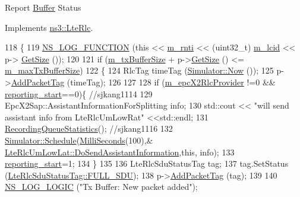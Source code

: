 Report \hyperlink{classns3_1_1Buffer}{Buffer} Status 

Implements \hyperlink{classns3_1_1LteRlc_af1e6ccdc5f9f2bee9d42a056e94351a5}{ns3\+::\+Lte\+Rlc}.


\begin{DoxyCode}
118 \{
119   \hyperlink{log-macros-disabled_8h_a90b90d5bad1f39cb1b64923ea94c0761}{NS\_LOG\_FUNCTION} (\textcolor{keyword}{this} << \hyperlink{classns3_1_1LteRlc_a48ab0a78e7f2687337075b1c8832df70}{m\_rnti} << (uint32\_t) \hyperlink{classns3_1_1LteRlc_a051085e9b27883e7ba4b98ad7242fd8a}{m\_lcid} << p->
      \hyperlink{classns3_1_1Packet_a462855c9929954d4301a4edfe55f4f1c}{GetSize} ());
120 
121   \textcolor{keywordflow}{if} (\hyperlink{classns3_1_1LteRlcUmLowLat_a730b3933118b7d511e4aedab828e07aa}{m\_txBufferSize} + p->\hyperlink{classns3_1_1Packet_a462855c9929954d4301a4edfe55f4f1c}{GetSize} () <= \hyperlink{classns3_1_1LteRlcUmLowLat_ae50ae79e638fbeadc0a89e7a4f4371e1}{m\_maxTxBufferSize})
122     \{
124       RlcTag timeTag (\hyperlink{classns3_1_1Simulator_ac3178fa975b419f7875e7105be122800}{Simulator::Now} ());
125       p->\hyperlink{classns3_1_1Packet_a7400b8655852f5271c5957250d0141af}{AddPacketTag} (timeTag);
126 
127 
128       \textcolor{keywordflow}{if} (\hyperlink{classns3_1_1LteRlc_aa997bbf2807b79443887abd57facd1c8}{m\_epcX2RlcProvider} !=0 && \hyperlink{classns3_1_1LteRlcUmLowLat_ad6a6d38a3e9ffbbd185cc16ca102a621}{reporting\_start}==0)\{ \textcolor{comment}{//sjkang1114}
129        EpcX2Sap::AssistantInformationForSplitting info;
130       std::cout << \textcolor{stringliteral}{"will send assistant info from LteRlcUmLowRat"} <<std::endl;
131       \hyperlink{classns3_1_1LteRlcUmLowLat_a870c248887c99b35ff6ab45b1f1d6002}{RecordingQueueStatistics}(); \textcolor{comment}{//sjkang1116}
132       \hyperlink{classns3_1_1Simulator_a671882c894a08af4a5e91181bf1eec13}{Simulator::Schedule}(\hyperlink{group__timecivil_gaf26127cf4571146b83a92ee18679c7a9}{MilliSeconds}(100),&
      \hyperlink{classns3_1_1LteRlcUmLowLat_a4b446246590f6bfe283c69a9fc609f6e}{LteRlcUmLowLat::DoSendAssistantInformation},\textcolor{keyword}{this}, info);
133       \hyperlink{classns3_1_1LteRlcUmLowLat_ad6a6d38a3e9ffbbd185cc16ca102a621}{reporting\_start}=1;
134        \}
135 
136       LteRlcSduStatusTag tag;
137       tag.SetStatus (\hyperlink{classns3_1_1LteRlcSduStatusTag_ae7822c5cc0d54a3d193b09a91ed6f133ade41b0025c66cd211e992196f314d4a5}{LteRlcSduStatusTag::FULL\_SDU});
138       p->\hyperlink{classns3_1_1Packet_a7400b8655852f5271c5957250d0141af}{AddPacketTag} (tag);
139 
140       \hyperlink{group__logging_ga88acd260151caf2db9c0fc84997f45ce}{NS\_LOG\_LOGIC} (\textcolor{stringliteral}{"Tx Buffer: New packet added"});

\end{DoxyCode}
